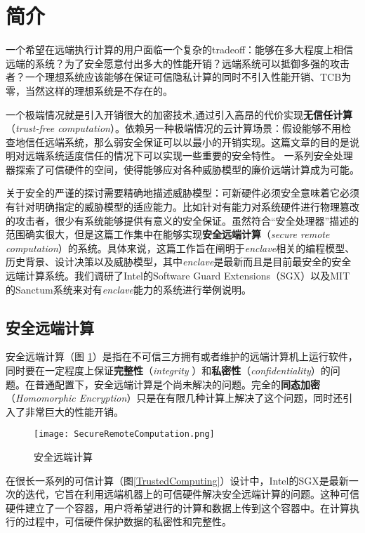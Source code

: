 \section{简介}
一个希望在远端执行计算的用户面临一个复杂的tradeoff：能够在多大程度上相信远端的系统？为了安全愿意付出多大的性能开销？远端系统可以抵御多强的攻击者？一个理想系统应该能够在保证可信隐私计算的同时不引入性能开销、TCB为零，当然这样的理想系统是不存在的。

一个极端情况就是引入开销很大的加密技术,通过引入高昂的代价实现\textbf{无信任计算}（\textit{trust-free computation}）。依赖另一种极端情况的云计算场景：假设能够不用检查地信任远端系统，那么弱安全保证可以以最小的开销实现。这篇文章的目的是说明对远端系统适度信任的情况下可以实现一些重要的安全特性。 一系列安全处理器探索了可信硬件的空间，使得能够应对各种威胁模型的廉价远端计算成为可能。

关于安全的严谨的探讨需要精确地描述威胁模型：可新硬件必须安全意味着它必须有针对明确指定的威胁模型的适应能力。比如针对有能力对系统硬件进行物理篡改的攻击者，很少有系统能够提供有意义的安全保证。虽然符合“安全处理器”描述的范围确实很大，但是这篇工作集中在能够实现\textbf{安全远端计算}（\textit{secure remote computation}）的系统。具体来说，这篇工作旨在阐明于\textit{enclave}相关的编程模型、历史背景、设计决策以及威胁模型，其中\textit{enclave}是最新而且是目前最安全的安全远端计算系统。我们调研了Intel的Software Guard Extensions（SGX）以及MIT的Sanctum系统来对有\textit{enclave}能力的系统进行举例说明。

\subsection{安全远端计算}

安全远端计算（图 \ref{SecureRemoteComputation}）是指在不可信三方拥有或者维护的远端计算机上运行软件，同时要在一定程度上保证\textbf{完整性}（\textit{integrity }）和\textbf{私密性}（\textit{confidentiality}）的问题。在普通配置下，安全远端计算是个尚未解决的问题。完全的\textbf{同态加密}（\textit{Homomorphic Encryption}）只是在有限几种计算上解决了这个问题，同时还引入了非常巨大的性能开销。
\begin{figure}
\centering
\texttt{[image: SecureRemoteComputation.png]}
\caption{安全远端计算}
\label{SecureRemoteComputation}
\end{figure}

在很长一系列的可信计算（图\ref{TrustedComputing}）设计中，Intel的SGX是最新一次的迭代，它旨在利用远端机器上的可信硬件解决安全远端计算的问题。这种可信硬件建立了一个容器，用户将希望进行的计算和数据上传到这个容器中。在计算执行的过程中，可信硬件保护数据的私密性和完整性。


